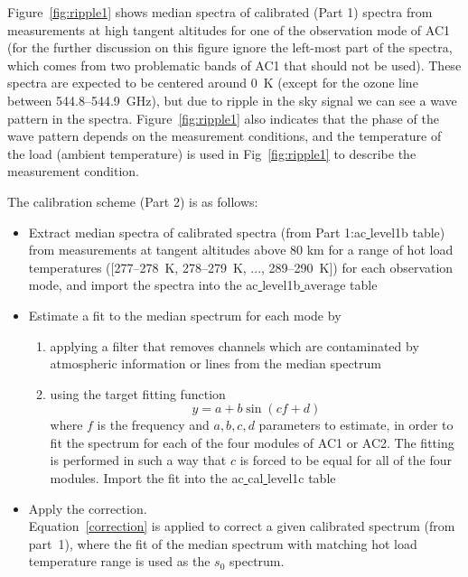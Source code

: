 Figure~\ref{fig:ripple1} shows median spectra of calibrated (Part 1) spectra
from measurements at high tangent altitudes for one of the
observation mode of AC1 (for the further discussion on this figure
ignore the left-most part of the spectra, which comes from two 
problematic bands of AC1 that should not be used). 
These spectra are expected to be 
centered around 0~K (except for the ozone line between 544.8--544.9~GHz), 
but due to ripple in the sky signal we can see a wave pattern in the spectra.
Figure~\ref{fig:ripple1} also indicates that the phase of the wave pattern
depends on the measurement conditions, and the temperature of
the load (ambient temperature) is used in Fig~\ref{fig:ripple1}
to describe the measurement condition.


The calibration scheme (Part 2) is as follows:
\begin{itemize}
\item Extract median spectra of calibrated spectra 
(from Part 1:ac\underline{ }level1b table) 
from measurements at tangent altitudes above 80 km for a range of hot load 
temperatures ([277--278~K, 278--279~K, ..., 289--290~K]) 
for each observation mode, and import the spectra
into the ac\underline{ }level1b\underline{ }average table
\item Estimate a fit to the median spectrum for each mode by
\begin{enumerate}
\item applying a filter that removes channels which are contaminated by 
atmospheric information or lines from the median spectrum 
\item using the target fitting function  
\begin{equation}
y=a+ b\sin(cf+d)
\end{equation}
where \(f\) is the frequency and \(a,b,c,d\) parameters to estimate,
in order to fit the spectrum for each of the four modules of AC1 or AC2.
The fitting is performed in such a way that \(c\) is forced 
to be equal for all of the four modules. 
Import the fit into the ac\underline{ }cal\underline{ }level1c
table
\end{enumerate}
\item Apply the correction.\\
Equation~\ref{correction} is applied to correct a given calibrated 
spectrum (from part~1), where the fit of the median spectrum
with matching hot load temperature range is used as the \(s_{0}\)
spectrum. 
\end{itemize}



